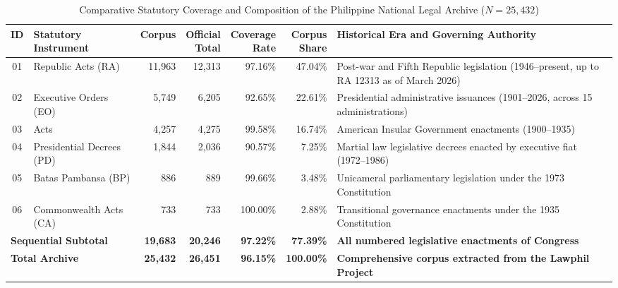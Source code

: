         \begin{table}[!htbp]
            \centering
            \footnotesize
            \setlength{\tabcolsep}{3.8pt}
            \caption[Comparative Statutory Coverage of the National Legal Archive]{Comparative Statutory Coverage and Composition of the Philippine National Legal Archive ($N = 25,432$)}
            \label{tab:statute_type_composition}
            \begin{tabularx}{\linewidth}{c>{\RaggedRight}p{2.85cm}rrrr>{\RaggedRight}X}
                \toprule
                \textbf{ID} & \shortstack[l]{\textbf{Statutory}\\\textbf{Instrument}} & \textbf{Corpus} & \shortstack[r]{\textbf{Official}\\\textbf{Total}} & \shortstack[r]{\textbf{Coverage}\\\textbf{Rate}} & \shortstack[r]{\textbf{Corpus}\\\textbf{Share}} & \textbf{Historical Era and Governing Authority} \\
                \midrule
                01 & Republic Acts (RA) & 11,963 & 12,313 & 97.16\% & 47.04\% & Post-war and Fifth Republic legislation (1946--present, up to RA 12313 as of March 2026) \\
                02 & Executive Orders (EO) & 5,749 & 6,205 & 92.65\% & 22.61\% & Presidential administrative issuances (1901--2026, across 15 administrations) \\
                03 & Acts & 4,257 & 4,275 & 99.58\% & 16.74\% & American Insular Government enactments (1900--1935) \\
                04 & Presidential Decrees (PD) & 1,844 & 2,036 & 90.57\% & 7.25\% & Martial law legislative decrees enacted by executive fiat (1972--1986) \\
                05 & Batas Pambansa (BP) & 886 & 889 & 99.66\% & 3.48\% & Unicameral parliamentary legislation under the 1973 Constitution \\
                06 & Commonwealth Acts (CA) & 733 & 733 & 100.00\% & 2.88\% & Transitional governance enactments under the 1935 Constitution \\
                \midrule
                \multicolumn{2}{l}{\textbf{Sequential Subtotal}} & \textbf{19,683} & \textbf{20,246} & \textbf{97.22\%} & \textbf{77.39\%} & \textbf{All numbered legislative enactments of Congress} \\
                \multicolumn{2}{l}{\textbf{Total Archive}} & \textbf{25,432} & \textbf{26,451} & \textbf{96.15\%} & \textbf{100.00\%} & \textbf{Comprehensive corpus extracted from the Lawphil Project} \\
                \bottomrule
            \end{tabularx}
        \end{table}


